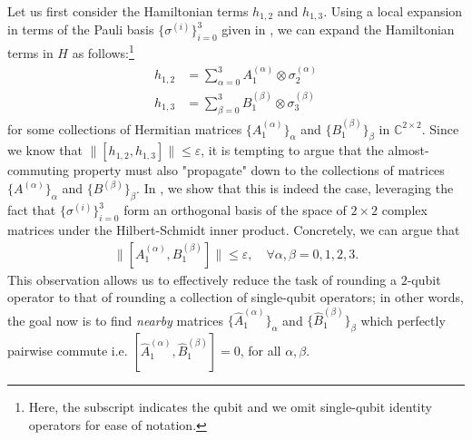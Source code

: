\documentclass[11pt]{article}
\theoremstyle{plain}
\newcommand{\eps}{\varepsilon}
\begin{document}
Let us first consider the Hamiltonian terms $h_{1,2}$ and $h_{1,3}$. 
Using a local expansion in terms of the Pauli basis $\{\sigma^{(i)}\}_{i=0}^3$ given in , we can expand the Hamiltonian terms in $H$ as follows:\footnote{Here, the subscript indicates the qubit and we omit single-qubit identity operators for ease of notation.}
\begin{align}
h_{1,2} &= \sum_{\alpha=0}^3 A^{(\alpha)}_1 \otimes \sigma_2^{(\alpha)}  \label{eq:pauli-decomp-h12}\\
h_{1,3} &= \sum_{\beta=0}^3 B^{(\beta)}_1 \otimes \sigma_3^{(\beta)}  \label{eq:pauli-decomp-h13} 
\end{align}
for some collections of Hermitian matrices $\{A_1^{(\alpha)}\}_\alpha$ and $\{B_1^{(\beta)}\}_\beta$ in $\mathbb{C}^{2 \times 2}$.
Since we know that $\|[h_{1,2},h_{1,3}]\| \leq \eps$, it is tempting to argue that the almost-commuting property must also "propagate" down to the collections of matrices $\{A^{(\alpha)}\}_\alpha$ and $\{B^{(\beta)}\}_\beta$. In , we show that this is indeed the case, leveraging the fact that $\{\sigma^{(i)}\}_{i=0}^3$ form an orthogonal basis of the space of $2\times 2$ complex matrices under the Hilbert-Schmidt inner product. Concretely, we can argue that
\begin{align}\label{eq:almost-commuting-A-B}
\|[A_1^{(\alpha)}, B_1^{(\beta)}]\| \leq \eps, \quad \forall 
\alpha,\beta=0,1,2,3.
\end{align}
This observation allows us to effectively reduce the task of rounding a $2$-qubit operator to that of rounding a collection of single-qubit operators; in other words, the goal now is to find \emph{nearby} matrices $\{\hat A_1^{(\alpha)}\}_\alpha$ and $\{\hat B_1^{(\beta)}\}_\beta$ which perfectly pairwise commute i.e. $[\hat A_1^{(\alpha)}, \hat B_1^{(\beta)}]=0$, for all $\alpha,\beta$. 
\end{document}
